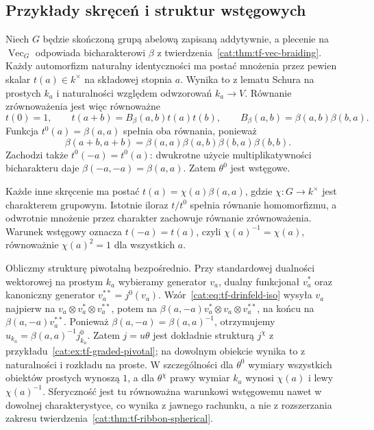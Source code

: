 \subsection{Przykłady skręceń i struktur wstęgowych}

\begin{przyklad}\label{cat:ex:tf-bicharacter-twist}
Niech $G$ będzie skończoną grupą abelową zapisaną addytywnie, a plecenie na $\operatorname{Vec}_G$ odpowiada bicharakterowi $\beta$ z twierdzenia~\ref{cat:thm:tf-vec-braiding}. Każdy automorfizm naturalny identyczności ma postać mnożenia przez pewien skalar $t(a)\in k^\times$ na składowej stopnia $a$. Wynika to z lematu Schura na prostych $k_a$ i naturalności względem odwzorowań $k_a\to V$. Równanie zrównoważenia jest więc równoważne
\[
 t(0)=1,\qquad
 t(a+b)=B_\beta(a,b)t(a)t(b),
 \qquad B_\beta(a,b)=\beta(a,b)\beta(b,a).
\]
Funkcja $t^0(a)=\beta(a,a)$ spełnia oba równania, ponieważ
\[
 \beta(a+b,a+b)=\beta(a,a)\beta(a,b)\beta(b,a)\beta(b,b).
\]
Zachodzi także $t^0(-a)=t^0(a)$: dwukrotne użycie multiplikatywności bicharakteru daje $\beta(-a,-a)=\beta(a,a)$. Zatem $\theta^0$ jest wstęgowe.

Każde inne skręcenie ma postać $t(a)=\chi(a)\beta(a,a)$, gdzie $\chi:G\to k^\times$ jest charakterem grupowym. Istotnie iloraz $t/t^0$ spełnia równanie homomorfizmu, a odwrotnie mnożenie przez charakter zachowuje równanie zrównoważenia. Warunek wstęgowy oznacza $t(-a)=t(a)$, czyli $\chi(a)^{-1}=\chi(a)$, równoważnie $\chi(a)^2=1$ dla wszystkich $a$.

Obliczmy strukturę piwotalną bezpośrednio. Przy standardowej dualności wektorowej na prostym $k_a$ wybieramy generator $v_a$, dualny funkcjonał $v_a^*$ oraz kanoniczny generator $v_a^{**}=j^0(v_a)$. Wzór~\eqref{cat:eq:tf-drinfeld-iso} wysyła $v_a$ najpierw na $v_a\otimes v_a^*\otimes v_a^{**}$, potem na $\beta(a,-a)v_a^*\otimes v_a\otimes v_a^{**}$, na końcu na $\beta(a,-a)v_a^{**}$. Ponieważ $\beta(a,-a)=\beta(a,a)^{-1}$, otrzymujemy $u_{k_a}=\beta(a,a)^{-1}j^0_{k_a}$. Zatem $j=u\theta$ jest dokładnie strukturą $j^\chi$ z przykładu~\ref{cat:ex:tf-graded-pivotal}; na dowolnym obiekcie wynika to z naturalności i rozkładu na proste. W szczególności dla $\theta^0$ wymiary wszystkich obiektów prostych wynoszą $1$, a dla $\theta^\chi$ prawy wymiar $k_a$ wynosi $\chi(a)$ i lewy $\chi(a)^{-1}$. Sferyczność jest tu równoważna warunkowi wstęgowemu nawet w dowolnej charakterystyce, co wynika z jawnego rachunku, a nie z rozszerzania zakresu twierdzenia~\ref{cat:thm:tf-ribbon-spherical}.
\end{przyklad}

